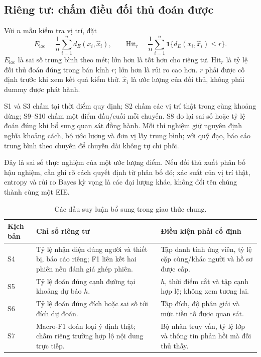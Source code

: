 \documentclass[12pt,a4paper,oneside]{report}
\begin{document}


\subsection{Riêng tư: chấm điều đối thủ đoán được}

Với $n$ mẫu kiểm tra vị trí, đặt
\[
E_{\mathrm{loc}}=\frac1n\sum_{i=1}^{n}d_E(x_i,\widehat x_i),\qquad
\mathrm{Hit}_r=\frac1n\sum_{i=1}^{n}
\mathbf1\{d_E(x_i,\widehat x_i)\le r\}.
\]
$E_{\mathrm{loc}}$ là sai số trung bình theo mét; lớn hơn là tốt hơn cho riêng tư. $\mathrm{Hit}_r$ là tỷ lệ đối thủ đoán đúng trong bán kính $r$; lớn hơn là rủi ro cao hơn. $r$ phải được cố định trước khi xem kết quả kiểm thử. $\widehat x_i$ là ước lượng của đối thủ, không phải dummy được phát hành.

S1 và S3 chấm tại thời điểm quy định; S2 chấm các vị trí thật trong cùng khoảng dừng; S9--S10 chấm một điểm đầu/cuối mỗi chuyến. S8 đo lại sai số hoặc tỷ lệ đoán đúng khi bổ sung quan sát đồng hành. Mỗi thí nghiệm giữ nguyên định nghĩa khoảng cách, bộ ước lượng và đơn vị lấy trung bình; với quỹ đạo, báo cáo trung bình theo chuyến để chuyến dài không tự chi phối.

Đây là sai số thực nghiệm của một ước lượng điểm. Nếu đối thủ xuất phân bố hậu nghiệm, cần ghi rõ cách quyết định từ phân bố đó; xác suất của vị trí thật, entropy và rủi ro Bayes kỳ vọng là các đại lượng khác, không đổi tên chúng thành cùng một EIE.

\begin{table}[htbp]
\centering\small
\caption{Các đầu suy luận bổ sung trong giao thức chung.}
\begin{tabularx}{\textwidth}{P{2.0cm}Y Y}
\toprule
\textbf{Kịch bản} & \textbf{Chỉ số riêng tư} & \textbf{Điều kiện phải cố định}\\
\midrule
S4 & Tỷ lệ nhận diện đúng người và thiết bị, báo cáo riêng; F1 liên kết hai phiên nếu đánh giá ghép phiên. & Tập danh tính ứng viên, tỷ lệ cặp cùng/khác người và hồ sơ được cấp.\\
\addlinespace
S5 & Tỷ lệ đoán đúng cạnh đường tại khoảng dự báo $h$. & $h$, thời điểm cắt và tập cạnh hợp lệ; không xem tương lai.\\
\addlinespace
S6 & Tỷ lệ đoán đúng đích hoặc sai số tới đích dự đoán. & Tập đích, độ phân giải và mức tiền tố được quan sát.\\
\addlinespace
S7 & Macro-F1 đoán loại ý định thật; chấm riêng trường hợp lộ nội dung trực tiếp. & Bộ nhãn truy vấn, tỷ lệ lớp và thông tin phản hồi mà đối thủ thấy.\\
\bottomrule
\end{tabularx}
\end{table}
\end{document}
